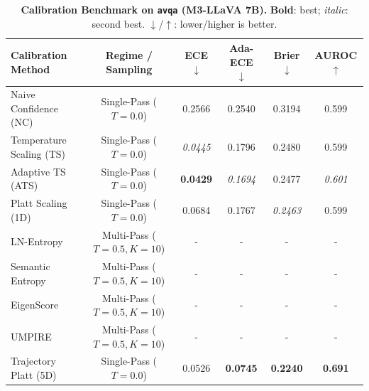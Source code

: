 \begin{table}[t]
\setlength{\tabcolsep}{4pt}
\renewcommand{\arraystretch}{1.05}
\centering
\footnotesize
\begin{tabular}{lccccc}
\toprule
\textbf{Calibration Method} & \textbf{Regime / Sampling} & \textbf{ECE} $\downarrow$ & \textbf{Ada-ECE} $\downarrow$ & \textbf{Brier} $\downarrow$ & \textbf{AUROC} $\uparrow$ \\
\midrule
Naive Confidence (NC) & Single-Pass ($T = 0.0$) & 0.2566 & 0.2540 & 0.3194 & 0.599 \\
Temperature Scaling (TS) & Single-Pass ($T = 0.0$) & \textit{0.0445} & 0.1796 & 0.2480 & 0.599 \\
Adaptive TS (ATS) & Single-Pass ($T = 0.0$) & \textbf{0.0429} & \textit{0.1694} & 0.2477 & \textit{0.601} \\
Platt Scaling (1D) & Single-Pass ($T = 0.0$) & 0.0684 & 0.1767 & \textit{0.2463} & 0.599 \\
LN-Entropy & Multi-Pass ($T = 0.5, K = 10$) & - & - & - & - \\
Semantic Entropy & Multi-Pass ($T = 0.5, K = 10$) & - & - & - & - \\
EigenScore & Multi-Pass ($T = 0.5, K = 10$) & - & - & - & - \\
UMPIRE & Multi-Pass ($T = 0.5, K = 10$) & - & - & - & - \\
Trajectory Platt (5D) & Single-Pass ($T = 0.0$) & 0.0526 & \textbf{0.0745} & \textbf{0.2240} & \textbf{0.691} \\
\bottomrule
\end{tabular}
\caption{\textbf{Calibration Benchmark on \texttt{avqa} (M3-LLaVA 7B).} \textbf{Bold}: best; \textit{italic}: second best. $\downarrow$/$\uparrow$: lower/higher is better.}
\label{tab:benchmark_m3_avqa}
\end{table}

